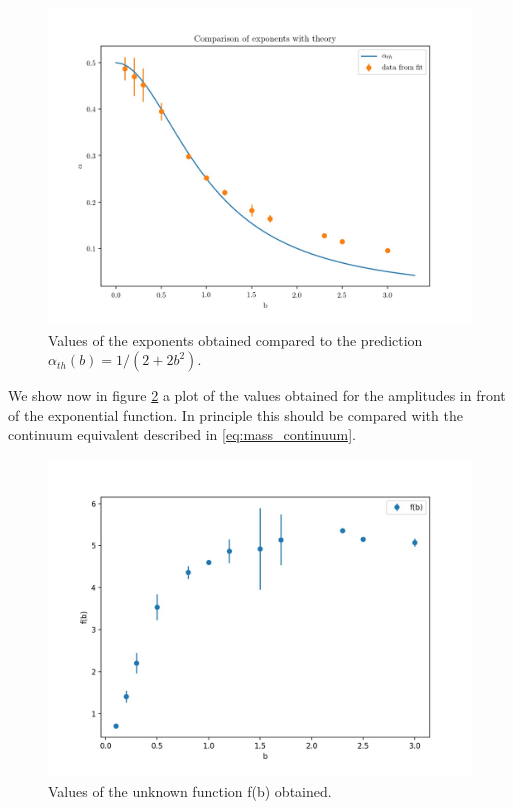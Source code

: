 \documentclass[12pt,a4paper]{report}
\begin{document}
\begin{figure}
\centering
\includegraphics[width=1.0\textwidth]{alphavsb}
\caption{Values of the exponents obtained compared to the prediction $\alpha_{th}(b)=1/(2+2b^2)$.}
\label{fig:alphavsb}
\end{figure} 

 We show now in figure \ref{fig:f_b} a plot of the values obtained for the amplitudes in front of the exponential function. In principle this should be compared with the continuum equivalent described in \eqref{eq:mass_continuum}.
\begin{figure}
\centering
\includegraphics[width=1.0\textwidth]{f_b_corr}
\caption{Values of the unknown function f(b) obtained.}
\label{fig:f_b}
\end{figure} 
\end{document}
